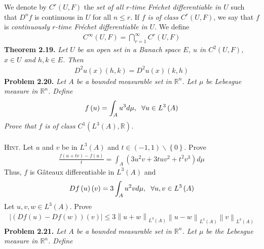 \documentclass[a4paper]{article}
\numberwithin{equation}{section}
\begin{document}
We denote by $C^r\left(U,F\right)$ the \textit{set of all $r$-time Fr\'{e}chet differentiable in $U$} such that $D^nf$ is continuous in $U$ for all $n\le r$. If \textit{$f$ is of class $C^r\left(U,F\right)$}, we say that $f$ is \textit{continuously $r$-time Fr\'{e}chet differentiable in $U$}. We define
\begin{align}
{C^\infty }\left( {U,F} \right) = \bigcap\limits_{r = 1}^\infty  {{C^r}\left( {U,F} \right)} 
\end{align}
\textbf{Theorem 2.19.} \textit{Let $U$ be an open set in a Banach space $E$, $u$ in $C^2\left(U,F\right)$, $x\in U$ and $h,k\in E$. Then}
\begin{align}
{D^2}u\left( x \right)\left( {h,k} \right) = {D^2}u\left( x \right)\left( {k,h} \right)
\end{align}
\textbf{Problem 2.20.} \textit{Let $A$ be a bounded measurable set in $\mathbb{R}^n$. Let $\mu$ be Lebesgue measure in $\mathbb{R}^n$. Define}
\begin{align}
f\left( u \right) = \int_A {{u^3}d\mu } ,\hspace{0.2cm}\forall u \in {L^3}\left( A \right)
\end{align}
\textit{Prove that $f$ is of class ${C^1}\left( {{L^3}\left( A \right),\mathbb{R}} \right)$.}\\
\\
\textsc{Hint.} Let $u$ and $v$ be in $L^3\left(A\right)$ and $t \in \left( { - 1,1} \right)\backslash \left\{ 0 \right\}$. Prove
\begin{align}
\frac{{f\left( {u + tv} \right) - f\left( u \right)}}{t} = \int_A {\left( {3{u^2}v + 3tu{v^2} + {t^2}{v^3}} \right)d\mu } 
\end{align}
Thus, $f$ is G\^{a}teaux differentiable in $L^3\left(A\right)$ and
\begin{align}
Df\left( u \right)\left( v \right) = 3\int_A {{u^2}vd\mu } ,\hspace{0.2cm}\forall u,v \in {L^3}\left( A \right)
\end{align}
Let $u,v,w \in L^3\left(A\right)$. Prove
\begin{align}
\left| {\left( {Df\left( u \right) - Df\left( w \right)} \right)\left( v \right)} \right| \le 3{\left\| {u + w} \right\|_{{L^3}\left( A \right)}}{\left\| {u - w} \right\|_{{L^3}\left( A \right)}}{\left\| v \right\|_{{L^3}\left( A \right)}}
\end{align}
\textbf{Problem 2.21.} \textit{Let $A$ be a bounded measurable set in $\mathbb{R}^n$. Let $\mu$ be the Lebesgue measure in $\mathbb{R}^n$. Define}
\end{document}
